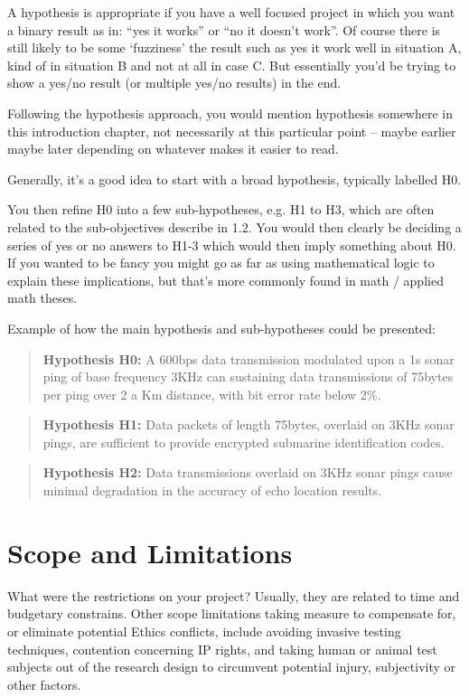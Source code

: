 A hypothesis is appropriate if you have a well focused project in which you want a binary result as in: ``yes it works'' or ``no it doesn’t work''. Of course there is still likely to be some `fuzziness' the result such as yes it work well in situation A, kind of in situation B and not at all in case C. But essentially you’d be trying to show a yes/no result (or multiple yes/no results) in the end.

Following the hypothesis approach, you would mention hypothesis somewhere in this introduction chapter, not necessarily at this particular point – maybe earlier maybe later depending on whatever makes it easier to read.

Generally, it’s a good idea to start with a broad hypothesis, typically labelled H0.

You then refine H0 into a few sub-hypotheses, e.g. H1 to H3, which are often related to the sub-objectives describe in 1.2. You would then clearly be deciding a series of yes or no answers to H1-3 which would then imply something about H0. If you wanted to be fancy you might go as far as using mathematical logic to explain these implications, but that’s more commonly found in math / applied math theses.

Example of how the main hypothesis and sub-hypotheses could be presented:

\begin{quote}
	\textbf{Hypothesis H0:} A 600bps data transmission modulated upon a 1s sonar ping of base frequency 3KHz can sustaining data transmissions of 75bytes per ping over 2 a Km distance, with bit error rate below 2\%.
\end{quote}

\begin{quote}
	\textbf{Hypothesis H1:} Data packets of length 75bytes, overlaid on 3KHz sonar pings, are sufficient to provide encrypted submarine identification codes.
\end{quote}

\begin{quote}
	\textbf{Hypothesis H2:} Data transmissions overlaid on 3KHz sonar pings cause minimal degradation in the accuracy of echo location results.
\end{quote}


\section{Scope and Limitations}

What were the restrictions on your project? Usually, they are related to time and budgetary constrains. Other scope limitations taking measure to compensate for, or eliminate potential Ethics conflicts, include avoiding invasive testing techniques, contention concerning IP rights, and taking human or animal test subjects out of the research design to circumvent potential injury, subjectivity or other factors.

